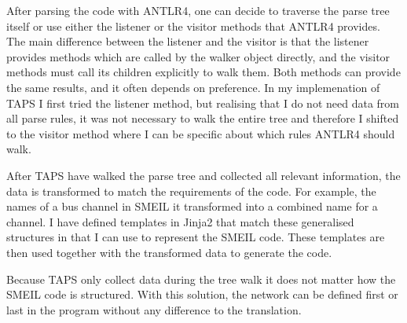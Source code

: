 After parsing the code with ANTLR4, one can decide to traverse the parse tree itself or use either the listener or the visitor methods that ANTLR4 provides. The main difference between the listener and the visitor is that the listener provides methods which are called by the walker object directly, and the visitor methods must call its children explicitly to walk them. Both methods can provide the same results, and it often depends on preference. In my implemenation of TAPS I first tried the listener method, but realising that I do not need data from all parse rules, it was not necessary to walk the entire tree and therefore I shifted to the visitor method where I can be specific about which rules ANTLR4 should walk.

After TAPS have walked the parse tree and collected all relevant information, the data is transformed to match the requirements of the \cspm{} code. For example, the names of a bus channel in SMEIL it transformed into a combined name for a \cspm{} channel. I have defined templates in Jinja2 that match these generalised structures in \cspm{} that I can use to represent the SMEIL code. These templates are then used together with the transformed data to generate the \cspm{} code.

Because TAPS only collect data during the tree walk it does not matter how the SMEIL code is structured. With this solution, the network can be defined first or last in the program without any difference to the translation. 

